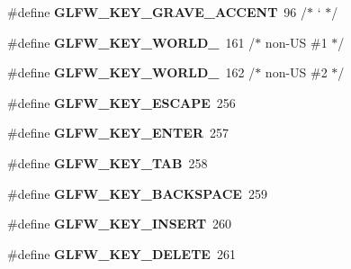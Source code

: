 \begin{DoxyCompactItemize}
\item 
\hypertarget{group__keys_ga7a3701fb4e2a0b136ff4b568c3c8d668}{}\#define {\bfseries G\+L\+F\+W\+\_\+\+K\+E\+Y\+\_\+\+G\+R\+A\+V\+E\+\_\+\+A\+C\+C\+E\+N\+T}~96  /$\ast$ ` $\ast$/\label{group__keys_ga7a3701fb4e2a0b136ff4b568c3c8d668}

\item 
\hypertarget{group__keys_gadc78dad3dab76bcd4b5c20114052577a}{}\#define {\bfseries G\+L\+F\+W\+\_\+\+K\+E\+Y\+\_\+\+W\+O\+R\+L\+D\+\_}~161 /$\ast$ non-\/U\+S \#1 $\ast$/\label{group__keys_gadc78dad3dab76bcd4b5c20114052577a}

\item 
\hypertarget{group__keys_ga20494bfebf0bb4fc9503afca18ab2c5e}{}\#define {\bfseries G\+L\+F\+W\+\_\+\+K\+E\+Y\+\_\+\+W\+O\+R\+L\+D\+\_}~162 /$\ast$ non-\/U\+S \#2 $\ast$/\label{group__keys_ga20494bfebf0bb4fc9503afca18ab2c5e}

\item 
\hypertarget{group__keys_gaac6596c350b635c245113b81c2123b93}{}\#define {\bfseries G\+L\+F\+W\+\_\+\+K\+E\+Y\+\_\+\+E\+S\+C\+A\+P\+E}~256\label{group__keys_gaac6596c350b635c245113b81c2123b93}

\item 
\hypertarget{group__keys_ga9555a92ecbecdbc1f3435219c571d667}{}\#define {\bfseries G\+L\+F\+W\+\_\+\+K\+E\+Y\+\_\+\+E\+N\+T\+E\+R}~257\label{group__keys_ga9555a92ecbecdbc1f3435219c571d667}

\item 
\hypertarget{group__keys_ga6908a4bda9950a3e2b73f794bbe985df}{}\#define {\bfseries G\+L\+F\+W\+\_\+\+K\+E\+Y\+\_\+\+T\+A\+B}~258\label{group__keys_ga6908a4bda9950a3e2b73f794bbe985df}

\item 
\hypertarget{group__keys_ga6c0df1fe2f156bbd5a98c66d76ff3635}{}\#define {\bfseries G\+L\+F\+W\+\_\+\+K\+E\+Y\+\_\+\+B\+A\+C\+K\+S\+P\+A\+C\+E}~259\label{group__keys_ga6c0df1fe2f156bbd5a98c66d76ff3635}

\item 
\hypertarget{group__keys_ga373ac7365435d6b0eb1068f470e34f47}{}\#define {\bfseries G\+L\+F\+W\+\_\+\+K\+E\+Y\+\_\+\+I\+N\+S\+E\+R\+T}~260\label{group__keys_ga373ac7365435d6b0eb1068f470e34f47}

\item 
\hypertarget{group__keys_gadb111e4df74b8a715f2c05dad58d2682}{}\#define {\bfseries G\+L\+F\+W\+\_\+\+K\+E\+Y\+\_\+\+D\+E\+L\+E\+T\+E}~261\label{group__keys_gadb111e4df74b8a715f2c05dad58d2682}


\end{DoxyCompactItemize}
